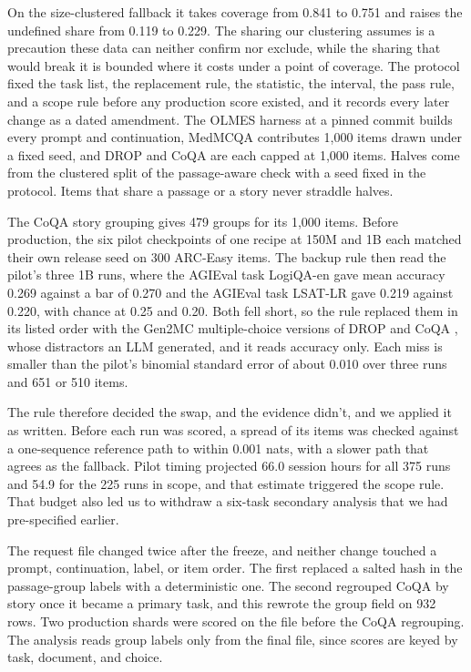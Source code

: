 On the size-clustered fallback it takes coverage from 0.841 to 0.751 and raises the undefined share from 0.119 to 0.229. The sharing our clustering assumes is a precaution these data can neither confirm nor exclude, while the sharing that would break it is bounded where it costs under a point of coverage.
\label{app:heldout}
The protocol fixed the task list, the replacement rule, the statistic, the interval, the pass rule, and a scope rule before any production score existed, and it records every later change as a dated amendment. The OLMES harness at a pinned commit builds every prompt and continuation, MedMCQA contributes 1,000 items drawn under a fixed seed, and DROP and CoQA are each capped at 1,000 items. Halves come from the clustered split of the passage-aware check with a seed fixed in the protocol. Items that share a passage or a story never straddle halves.

The CoQA story grouping gives 479 groups for its 1,000 items. Before production, the six pilot checkpoints of one recipe at 150M and 1B each matched their own release seed on 300 ARC-Easy items. The backup rule then read the pilot's three 1B runs, where the AGIEval task LogiQA-en \citep{liu2020logiqa} gave mean accuracy 0.269 against a bar of 0.270 and the AGIEval task LSAT-LR \citep{wang2022lsat} gave 0.219 against 0.220, with chance at 0.25 and 0.20. Both fell short, so the rule replaced them in its listed order with the Gen2MC multiple-choice versions of DROP and CoQA \citep{olmo2025olmo3}, whose distractors an LLM generated, and it reads accuracy only. Each miss is smaller than the pilot's binomial standard error of about 0.010 over three runs and 651 or 510 items.

The rule therefore decided the swap, and the evidence didn't, and we applied it as written. Before each run was scored, a spread of its items was checked against a one-sequence reference path to within 0.001 nats, with a slower path that agrees as the fallback. Pilot timing projected 66.0 session hours for all 375 runs and 54.9 for the 225 runs in scope, and that estimate triggered the scope rule. That budget also led us to withdraw a six-task secondary analysis that we had pre-specified earlier.

The request file changed twice after the freeze, and neither change touched a prompt, continuation, label, or item order. The first replaced a salted hash in the passage-group labels with a deterministic one. The second regrouped CoQA by story once it became a primary task, and this rewrote the group field on 932 rows. Two production shards were scored on the file before the CoQA regrouping. The analysis reads group labels only from the final file, since scores are keyed by task, document, and choice.

